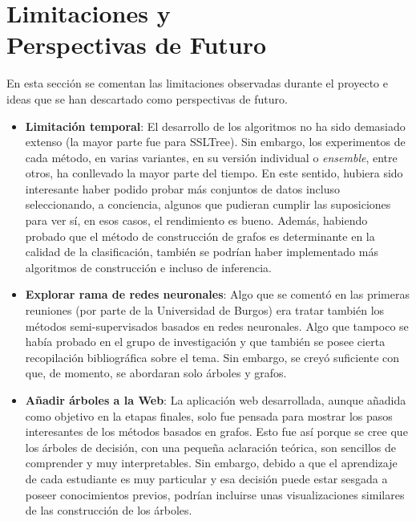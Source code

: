
\cleardoublepage

\chapter{Limitaciones y\\ Perspectivas de Futuro}
\label{limitaciones-y-futuro}

En esta sección se comentan las limitaciones observadas durante el proyecto e ideas que se han descartado como perspectivas de futuro.

\begin{itemize}
    \item \textbf{Limitación temporal}: El desarrollo de los algoritmos no ha sido demasiado extenso (la mayor parte fue para SSLTree). Sin embargo, los experimentos de cada método, en varias variantes, en su versión individual o \textit{ensemble}, entre otros, ha conllevado la mayor parte del tiempo. En este sentido, hubiera sido interesante haber podido probar más conjuntos de datos incluso seleccionando, a conciencia, algunos que pudieran cumplir las suposiciones para ver sí, en esos casos, el rendimiento es bueno. Además, habiendo probado que el método de construcción de grafos es determinante en la calidad de la clasificación, también se podrían haber implementado más algoritmos de construcción e incluso de inferencia.
    \item \textbf{Explorar rama de redes neuronales}: Algo que se comentó en las primeras reuniones (por parte de la Universidad de Burgos) era tratar también los métodos semi-supervisados basados en redes neuronales. Algo que tampoco se había probado en el grupo de investigación y que también se posee cierta recopilación bibliográfica sobre el tema. Sin embargo, se creyó suficiente con que, de momento, se abordaran solo árboles y grafos.
    \item \textbf{Añadir árboles a la Web}: La aplicación web desarrollada, aunque añadida como objetivo en la etapas finales, solo fue pensada para mostrar los pasos interesantes de los métodos basados en grafos. Esto fue así porque se cree que los árboles de decisión, con una pequeña aclaración teórica, son sencillos de comprender y muy interpretables. Sin embargo, debido a que el aprendizaje de cada estudiante es muy particular y esa decisión puede estar sesgada a poseer conocimientos previos, podrían incluirse unas visualizaciones similares de las construcción de los árboles.
\end{itemize}